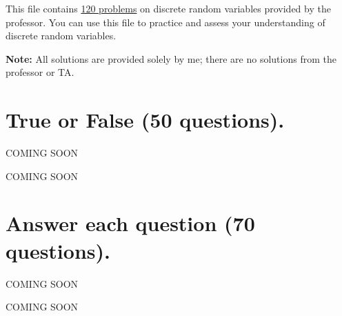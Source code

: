 \documentclass[a4paper, 10pt]{article}
\begin{document}
\subject[2110205 - Statistics for Computer Engineering]

\noindent This file contains \underline{120 problems} on discrete random variables provided by the professor.
You can use this file to practice and assess your understanding of discrete random variables.

\vspace{2mm}

\noindent \textbf{Note:} All solutions are provided solely by me; there are no solutions from the professor or TA.

\section{True or False (50 questions).}

\begin{problem}
COMING SOON
\end{problem}

\begin{solution}
  COMING SOON
\end{solution}


\section{Answer each question (70 questions).}

\begin{problem}[51]
COMING SOON
\end{problem}

\begin{solution}
  COMING SOON
\end{solution}
\end{document}
